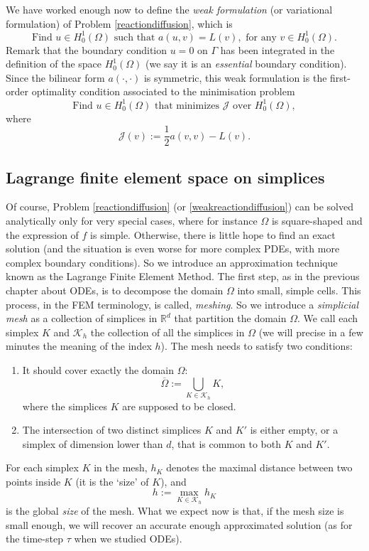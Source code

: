 \documentclass{article}
\begin{document}
We have worked enough now to define the \emph{weak formulation} (or variational formulation) of Problem \eqref{reactiondiffusion}, which is
\begin{equation}
    \label{weakreactiondiffusion}
    \textrm{Find } u \in H^1_0(\Omega)
    \textrm{ such that } a(u,v)=L(v),
    \textrm{ for any } v\in H^1_0(\Omega). 
\end{equation}
Remark that the boundary condition $u=0$ on $\Gamma$ has been integrated in the definition of the space $H^1_0(\Omega)$ (we say it is an \emph{essential} boundary condition). 
%
Since the bilinear form $a(\cdot,\cdot)$ is symmetric, this weak formulation is the first-order optimality condition associated to the minimisation problem
\begin{equation}
    \label{minreactiondiffusion}
    \textrm{Find } u \in H^1_0(\Omega)
    \textrm{ that minimizes } 
    \mathcal{J}
    \textrm{ over } H^1_0(\Omega), 
\end{equation}
where
\[
\mathcal{J} (v) := \frac12 a(v,v) - L(v).
\]

\subsection{Lagrange finite element space on simplices}

Of course, Problem \eqref{reactiondiffusion} (or \eqref{weakreactiondiffusion}) can be solved analytically only for very special cases, where for instance $\Omega$ is square-shaped and the expression of $f$ is simple. Otherwise, there is little hope to find an exact solution (and the situation is even worse for more complex PDEs, with more complex boundary conditions). So we introduce an approximation technique known as the Lagrange Finite Element Method. The first step, as in the previous chapter about ODEs, is to decompose the domain $\Omega$ into small, simple cells. This process, in the FEM terminology, is called, \emph{meshing}. So we introduce a \emph{simplicial mesh} as a collection of simplices in $\mathbb{R}^d$ that partition the domain $\Omega$. We call each simplex $K$ and $\mathcal{K}_h$ the collection of all the simplices in $\Omega$ (we will precise in a few minutes the meaning of the index $h$). The mesh needs to satisfy two conditions:
\begin{enumerate}
    \item It should cover exactly the domain $\Omega$:
    \[
    \overline{\Omega} := \bigcup_{K \in \mathcal{K}_h} K,
    \]
    where the simplices $K$ are supposed to be closed.
    \item The intersection of two distinct simplices $K$ and $K'$ is either empty, or a simplex of dimension lower than $d$, that is common to both $K$ and $K'$. %
\end{enumerate}
For each simplex $K$ in the mesh, $h_K$ denotes the maximal distance between two points inside $K$ (it is the `size' of $K$), and
\[
h := \max_{K \in \mathcal{K}_h} h_K
\]
is the global \emph{size} of the mesh. What we expect now is that, if the mesh size is small enough, we will recover an accurate enough approximated solution (as for the time-step $\tau$ when we studied ODEs).
\end{document}
